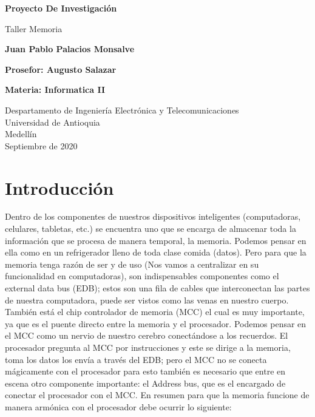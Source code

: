 \documentclass{article}
\begin{document}
\begin{titlepage}
    \begin{center}
        \vspace*{1cm}
            
        \Huge
        \textbf{Proyecto De Investigación}
            
        \vspace{0.5cm}
        \LARGE
        Taller Memoria
            
        \vspace{1.5cm}
            
        \textbf{Juan Pablo Palacios Monsalve}
            
      
        
        \vspace{2.0cm}
        \textbf{Prosefor: Augusto Salazar}
      
    
        \textbf{Materia: Informatica II}
      
        \vfill
        
        \vspace{0.8cm}
     
        \Large
        Despartamento de Ingeniería Electrónica y Telecomunicaciones\\
        Universidad de Antioquia\\
        Medellín\\
        Septiembre de 2020
      
    \end{center}
\end{titlepage}

\tableofcontents
\newpage
\section{Introducción}\label{intro}
Dentro de los componentes de nuestros dispositivos inteligentes (computadoras, celulares, tabletas, etc.) se encuentra uno que se encarga de almacenar toda la información que se procesa de manera temporal, la memoria. Podemos pensar en ella como en un refrigerador lleno de toda clase comida (datos).  Pero para que la memoria tenga razón de ser y de uso (Nos vamos a centralizar en su funcionalidad en computadoras), son indispensables componentes como el external data bus (EDB); estos son una fila de cables que interconectan las partes de nuestra computadora, puede ser vistos como las venas en nuestro cuerpo. También está el chip controlador de memoria (MCC) el cual es muy importante, ya que es el puente directo entre la memoria y el procesador. Podemos pensar en el MCC como un nervio de nuestro cerebro conectándose a los recuerdos. El procesador pregunta al MCC por instrucciones y este se dirige a la memoria, toma los datos los envía a través del EDB; pero el MCC no se conecta mágicamente con el procesador para esto también es necesario que entre en escena otro componente importante: el Address bus, que es el encargado de conectar el procesador con el MCC. En resumen para que la memoria funcione de manera armónica con el procesador debe ocurrir lo siguiente:
\end{document}
